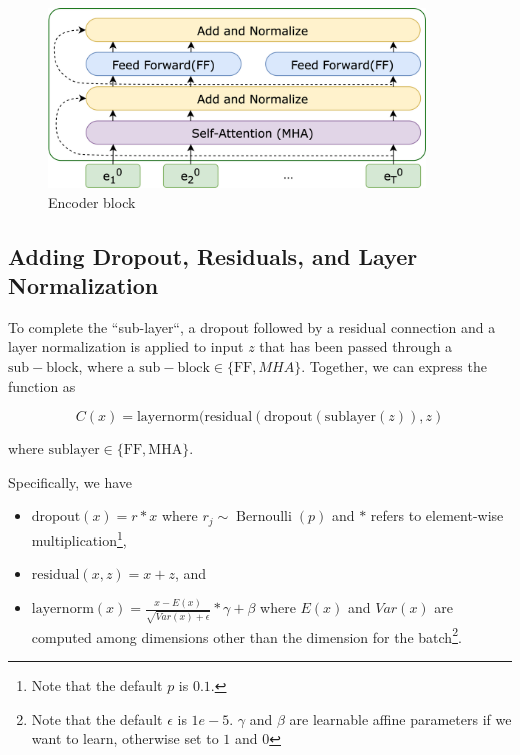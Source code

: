 \begin{figure}[h]
    \centering
    \includegraphics[width=10cm]{pages/imgs/encoder_block.png}
    \caption{Encoder block}
    \label{fig:encoder_block}
\end{figure}




\subsection{Adding Dropout, Residuals, and Layer Normalization}




To complete the ``sub-layer``, a dropout followed by a residual connection and a layer normalization is applied to input $z$ that has been passed through a $\mathrm{sub-block}$, where a $\mathrm{sub-block} \in \{\mathrm{FF}, MHA\}$. Together, we can express the function as

\begin{equation}
C(x) = \mathrm{layernorm}(\mathrm{residual}(\mathrm{dropout}(\mathrm{sublayer}(z)), z)
\end{equation}

where $\mathrm{sublayer} \in \{\mathrm{FF}, \mathrm{MHA}\}$.


Specifically, we have
\begin{itemize}
    \item $\mathrm{dropout}(x) = r * x$ where $ r_j \sim \operatorname{Bernoulli}(p)$ and $*$ refers to element-wise multiplication\footnote{Note that the default $p$ is $0.1$.},
    \item $\mathrm{residual}(x, z) = x + z$, and 
    \item $\mathrm{layernorm}(x) = \frac{x-E(x)}{\sqrt{Var(x)+\epsilon}}*\gamma + \beta$ where $E(x)$ and $Var(x)$ are computed among dimensions other than the dimension for the batch\footnote{Note that the default $\epsilon$ is $1e-5$. $\gamma$ and $\beta$ are learnable affine parameters if we want to learn, otherwise set to $1$ and $0$}.
\end{itemize}

